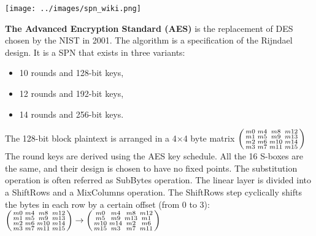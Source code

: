 \documentclass[11pt]{sdm}
\begin{document}
\begin{center}
    \texttt{[image: ../images/spn\_wiki.png]}
    \captionsetup{hypcap=false}
    \label{fig_spn}
\end{center}


\textbf{The Advanced Encryption Standard (AES)} is the replacement of DES chosen by the NIST in 2001.
The algorithm is a specification of the Rijndael design.
It is a SPN that exists in three variants:
\begin{itemize}
    \item 10 rounds and 128-bit keys,
    \item 12 rounds and 192-bit keys,
    \item 14 rounds and 256-bit keys.
\end{itemize}

The 128-bit block plaintext is arranged in a 4$\times$4 byte matrix
$\begin{psmallmatrix}
    m0 & m4 & m8 & m12 \\
    m1 & m5 & m9 & m13 \\
    m2 & m6 & m10 & m14 \\
    m3 & m7 & m11 & m15
\end{psmallmatrix}$
The round keys are derived using the AES key schedule.
All the 16 S-boxes are the same, and their design is chosen to have no fixed points.
The substitution operation is often referred as SubBytes operation.
The linear layer is divided into a ShiftRows and a MixColumns operation.
The ShiftRows step cyclically shifts the bytes in each row by a certain offset (from 0 to 3):
$\begin{psmallmatrix}
    m0 & m4 & m8 & m12 \\
    m1 & m5 & m9 & m13 \\
    m2 & m6 & m10 & m14 \\
    m3 & m7 & m11 & m15
\end{psmallmatrix}
\rightarrow
\begin{psmallmatrix}
    m0 & m4 & m8 & m12 \\
    m5 & m9 & m13 & m1 \\
    m10 & m14 & m2 & m6 \\
    m15 & m3 & m7 & m11 \\
\end{psmallmatrix}$
\end{document}
